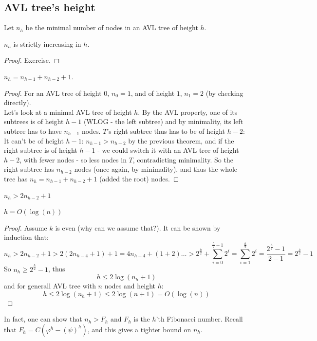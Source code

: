 \subsection{AVL tree's height}
Let $n_h$ be the minimal number of nodes in an AVL tree of height
$h$.\\
\begin{thm}
    $n_h$ is strictly increasing in $h$.
\end{thm}
\begin{proof} Exercise.
\end{proof}
\begin{thm}
$n_{h} = n_{h-1} + n_{h-2} + 1$.
\end{thm}
\begin{proof}For an AVL tree of height $0$, $n_0 = 1$,
and of height $1$, $n_1 = 2 $ (by checking directly).\\
    Let's look at a minimal AVL tree of height $h$. By the AVL property, one
of its subtrees is of height $h-1$ (WLOG - the left subtree) and by
minimality, its left subtree has to have $n_{h-1}$ nodes. $T$'s right subtree
thus has to be of height $h-2$: It can't be of height $h-1$: $n_{h-1} >
n_{h-2}$ by the previous theorem, and if the right subtree is of height $h-1$ -
we could switch it with an AVL tree of height $h-2$, with fewer nodes - so
less nodes in $T$, contradicting minimality. So the right subtree has
$n_{h-2}$ nodes (once again, by minimality), and thus the whole tree has
    $n_{h} = n_{h-1} + n_{h-2} + 1$ (added the root) nodes.
\end{proof}
\begin{cor}$n_h > 2n_{h-2} + 1$
\end{cor}
\begin{cor}$h = O(\log(n))$
\end{cor}
\begin{proof}
    Assume $k$ is even (why can we assume that?).
    It can be shown by induction that:
    \[
        n_h>2n_{h-2}+1>2(2n_{h-4}+1)+1=4n_{h-4}+(1+2)\ldots >
        2^{\frac{h}{2}}+\sum_{i=0}^{\frac{h}{2}-1}
        2^i=\sum_{i=1}^{\frac{h}{2}}2^i = \frac{2^\frac{h}{2} - 1}{2-1} =  2^{\frac{h}{2}} - 1
    \]
    So $n_h \geq 2^{\frac{h}{2}} - 1$, thus
    \[
        h\leq 2\log(n_h + 1)
    \]
    and for generall AVL tree with $n$ nodes and height $h$:
    \[
         h\leq 2\log(n_h + 1) \leq 2\log(n + 1) = O(\log(n))
    \]
\end{proof}
\begin{remark}
    In fact, one can show that $n_h > F_h$ and $F_h$ is the $h$'th Fibonacci
    number. Recall that $F_h = C(\varphi^h - (\psi)^h)$, and this gives a
    tighter bound on $n_h$.
\end{remark}

